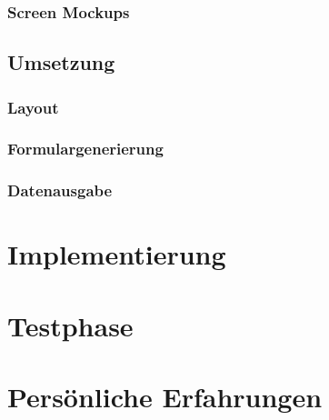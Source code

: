     \subsubsection{Screen Mockups}

  \subsection{Umsetzung}

    \subsubsection{Layout}

    \subsubsection{Formulargenerierung}

    \subsubsection{Datenausgabe}

\section{Implementierung}

\section{Testphase}

\section{Persönliche Erfahrungen}
